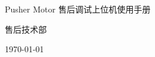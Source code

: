 \begin{titlepage}
    \centering
    \vspace*{3cm}

    {\heiti Pusher Motor 售后调试上位机使用手册 \par}

    \vfill

    {\songti 售后技术部 \par}
    \vspace{0.5cm}
    {\songti \today \par}

    \vspace*{3cm}
\end{titlepage}

